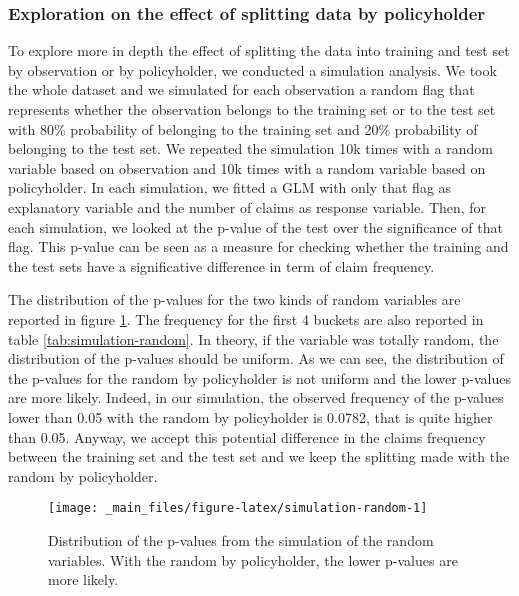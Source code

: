 \documentclass[a4paper, twoside, openright, 12pt]{report}
\theoremstyle{definition}
\theoremstyle{definition}
\theoremstyle{definition}
\theoremstyle{remark}
\begin{document}
\hypertarget{exploration-on-the-effect-of-splitting-data-by-policyholder}{%
\subsubsection{Exploration on the effect of splitting data by policyholder}\label{exploration-on-the-effect-of-splitting-data-by-policyholder}}

To explore more in depth the effect of splitting the data into training and test set by observation or by policyholder, we conducted a simulation analysis. We took the whole dataset and we simulated for each observation a random flag that represents whether the observation belongs to the training set or to the test set with 80\% probability of belonging to the training set and 20\% probability of belonging to the test set. We repeated the simulation 10k times with a random variable based on observation and 10k times with a random variable based on policyholder. In each simulation, we fitted a GLM with only that flag as explanatory variable and the number of claims as response variable. Then, for each simulation, we looked at the p-value of the test over the significance of that flag. This p-value can be seen as a measure for checking whether the training and the test sets have a significative difference in term of claim frequency.

The distribution of the p-values for the two kinds of random variables are reported in figure \ref{fig:simulation-random}. The frequency for the first 4 buckets are also reported in table \ref{tab:simulation-random}. In theory, if the variable was totally random, the distribution of the p-values should be uniform. As we can see, the distribution of the p-values for the random by policyholder is not uniform and the lower p-values are more likely. Indeed, in our simulation, the observed frequency of the p-values lower than 0.05 with the random by policyholder is 0.0782, that is quite higher than 0.05. Anyway, we accept this potential difference in the claims frequency between the training set and the test set and we keep the splitting made with the random by policyholder.





\begin{figure}[!hbtp]

{\centering \texttt{[image: \_main\_files/figure-latex/simulation-random-1]} 

}

\caption[Distribution of the p-values from the simulation of the random variables.]{Distribution of the p-values from the simulation of the random variables. With the random by policyholder, the lower p-values are more likely.}\label{fig:simulation-random}
\end{figure}
\end{document}
